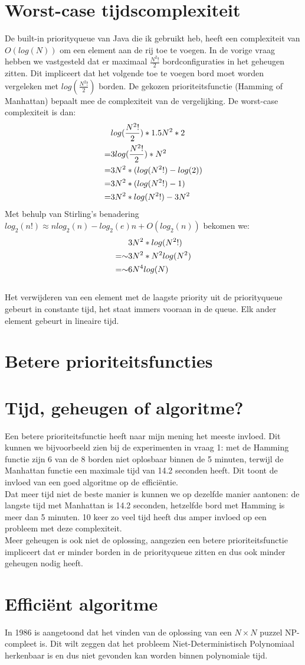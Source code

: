 \documentclass[11pt, a4paper]{article}
\begin{document}
\section*{Worst-case tijdscomplexiteit}
De built-in priorityqueue van Java die ik gebruikt heb, heeft een complexiteit van $O(log(N))$ om een element aan de rij toe te voegen. In de vorige vraag hebben we vastgesteld dat er maximaal $\frac{N^2!}{2}$ bordconfiguraties in het geheugen zitten. Dit impliceert dat het volgende toe te voegen bord moet worden vergeleken met $log(\frac{N^2!}{2})$ borden. De gekozen prioriteitsfunctie (Hamming of Manhattan) bepaalt mee de complexiteit van de vergelijking. De worst-case complexiteit is dan:
\\
	\begin{align}
	\centering
		&log(\frac{N^2!}{2}) * 1.5N^2 * 2 \\
	=   & 3log(\frac{N^2!}{2})*N^{2} \\
	=	& 3N^2*(log(N^2!)-log(2)) \\
	=   & 3N^2*(log(N^2!)-1) \\
	=   & 3N^2*log(N^2!) - 3N^2
	\end{align}
	Met behulp van Stirling's benadering $log_2(n!) \approx nlog_2(n) - log_2(e)n + O(log_2(n))$ bekomen we:
	\begin{align}
	\centering
		& 3N^2*log(N^2!) \\
	=\sim	& 3N^2*N^2log(N^2)\\
	=\sim	& 6N^4log(N)
	\end{align}
	\\
Het verwijderen van een element met de laagste priority uit de priorityqueue gebeurt in constante tijd, het staat immers vooraan in de queue. Elk ander element gebeurt in lineaire tijd. 
\newpage
\section*{Betere prioriteitsfuncties}
	

\section*{Tijd, geheugen of algoritme?}
Een betere prioriteitsfunctie heeft naar mijn mening het meeste invloed. Dit kunnen we bijvoorbeeld zien bij de experimenten in vraag 1: met de Hamming functie zijn 6 van de 8 borden niet oplosbaar binnen de 5 minuten, terwijl de Manhattan functie een maximale tijd van 14.2 seconden heeft. Dit toont de invloed van een goed algoritme op de effici\"entie.\\
Dat meer tijd niet de beste manier is kunnen we op dezelfde manier aantonen: de langste tijd met Manhattan is 14.2 seconden, hetzelfde bord met Hamming is meer dan 5 minuten. 10 keer zo veel tijd heeft dus amper invloed op een probleem met deze complexiteit.\\
Meer geheugen is ook niet de oplossing, aangezien een betere prioriteitsfunctie impliceert dat er minder borden in de priorityqueue zitten en dus ook minder geheugen nodig heeft.
	
\section*{Effici\"ent algoritme}
In 1986 is aangetoond dat het vinden van de oplossing van een $N \times N$ puzzel NP-compleet is. \cite{referentie} Dit wilt zeggen dat het probleem Niet-Deterministisch Polynomiaal herkenbaar is en dus niet gevonden kan worden binnen polynomiale tijd.
	
\end{document}
